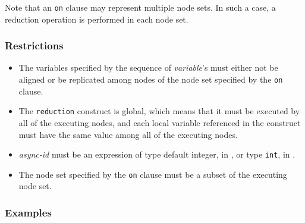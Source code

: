 Note that an {\tt on} clause may represent multiple node sets. In such a
case, a reduction operation is performed in each node set.

\subsubsection*{Restrictions}

\begin{itemize}
 \item The variables specified by the sequence of {\it variable}'s must
       either not be aligned or be replicated among nodes of the node
       set specified by the {\tt on} clause.
 \item The {\tt reduction} construct is global, which means that it must
       be executed by all of the executing nodes, and each local variable
       referenced in the construct must have the same value among all of
       the executing nodes.
 \item {\it async-id} must be an expression of type default integer, in
       {\XMPF}, or type {\tt int}, in {\XMPC}.
 \item The node set specified by the {\tt on} clause must be a subset of the
       executing node set.
\end{itemize}

\subsubsection*{Examples}

